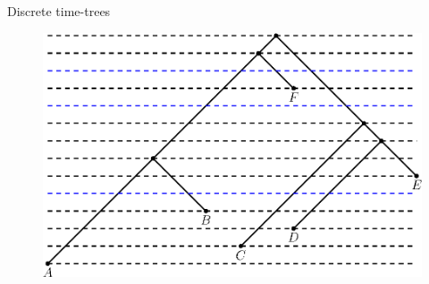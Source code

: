 \documentclass{beamer}
\theoremstyle{example}
\begin{document}
\begin{frame}{Discrete time-trees}
\begin{definition}
\begin{figure}
\centering
\includegraphics[width = \framewidth]{ranked_tree_dashed_time.eps}
\end{figure}
\end{definition}
\end{frame}
\end{document}
